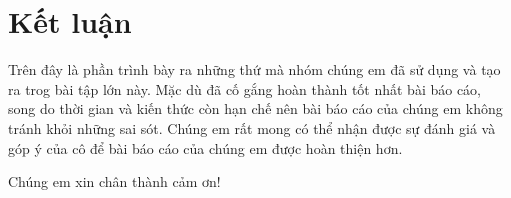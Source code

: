 \newpage                    %

\section*{Kết luận}
Trên đây là phần trình bày ra những thứ mà nhóm chúng em đã sử dụng và tạo ra trog bài tập lớn này. Mặc dù đã cố gắng hoàn thành tốt nhất bài báo cáo, song do thời gian và kiến thức còn hạn chế nên bài báo cáo của chúng em không tránh khỏi những sai sót. Chúng em rất mong có thể nhận được sự đánh giá và góp ý của cô để bài báo cáo của chúng em được hoàn thiện hơn.

\indent Chúng em xin chân thành cảm ơn!



